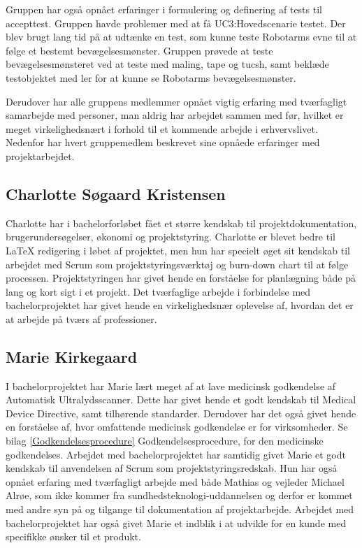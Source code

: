 Gruppen har også opnået erfaringer i formulering og definering af tests til accepttest. Gruppen havde problemer med at få UC3:Hovedscenarie testet. Der blev brugt lang tid på at udtænke en test, som kunne teste Robotarms evne til at følge et bestemt bevægelsesmønster. Gruppen prøvede at teste bevægelsesmønsteret ved at teste med maling, tape og tucsh, samt beklæde testobjektet med ler for at kunne se Robotarms bevægelsesmønster. 

Derudover har alle gruppens medlemmer opnået vigtig erfaring med tværfagligt samarbejde med personer, man aldrig har arbejdet sammen med før, hvilket er meget virkelighedsnært i forhold til et kommende arbejde i erhvervslivet.
Nedenfor har hvert gruppemedlem beskrevet sine opnåede erfaringer med projektarbejdet. 

\subsection{Charlotte Søgaard Kristensen}
Charlotte har i bachelorforløbet fået et større kendskab til projektdokumentation, brugerundersøgelser, økonomi og projektstyring. Charlotte er blevet bedre til LaTeX redigering i løbet af projektet, men hun har specielt øget sit kendskab til arbejdet med Scrum som projektstyringsværktøj og burn-down chart til at følge processen. Projektstyringen har givet hende en forståelse for planlægning både på lang og kort sigt i et projekt. Det tværfaglige arbejde i forbindelse med bachelorprojektet har givet hende en virkelighedsnær oplevelse af, hvordan det er at arbejde på tværs af professioner. 

\subsection{Marie Kirkegaard}
I bachelorprojektet har Marie lært meget af at lave medicinsk godkendelse af Automatisk Ultralydsscanner. Dette har givet hende et godt kendskab til Medical Device Directive, samt tilhørende standarder. Derudover har det også givet hende en forståelse af, hvor omfattende medicinsk godkendelse er for virksomheder. Se bilag \ref{Godkendelsesprocedure} Godkendelsesprocedure, for den medicinske godkendelses. Arbejdet med bachelorprojektet har samtidig givet Marie et godt kendskab til anvendelsen af Scrum som projektstyringsredskab. Hun har også opnået erfaring med tværfagligt arbejde med både Mathias og vejleder Michael Alrøe, som ikke kommer fra sundhedsteknologi-uddannelsen og derfor er kommet med andre syn på og tilgange til dokumentation af projektarbejde. Arbejdet med bachelorprojektet har også givet Marie et indblik i at udvikle for en kunde med specifikke ønsker til et produkt. 

